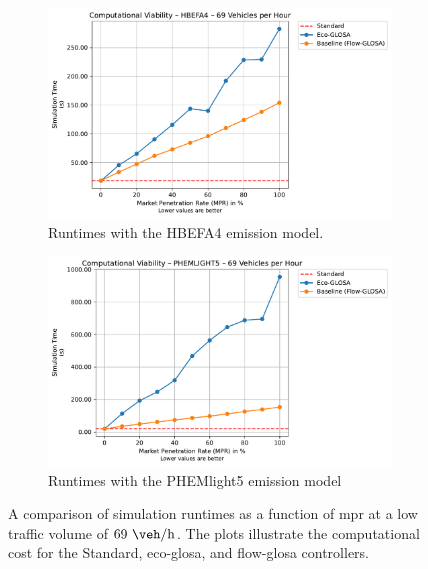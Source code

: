 \begin{figure}[htb]
  \centering
  \begin{subfigure}[b]{0.45\textwidth}
    \includegraphics[width=\textwidth]{data/img/ComputationalViability/ComputationalViability_HBEFA4_Cars69.pdf}
    \caption{Runtimes with the HBEFA4 emission model.}
    \label{fig:Comp_69_HBEFA4}
  \end{subfigure}\hfill
  \begin{subfigure}[b]{0.45\textwidth}
    \includegraphics[width=\textwidth]{data/img/ComputationalViability/ComputationalViability_PHEMLIGHT5_Cars69.pdf}
    \caption{Runtimes with the PHEMlight5 emission model}
    \label{fig:Comp_69_PHEM}
  \end{subfigure}
  \caption[Computational Cost at Low Traffic Volume]{A comparison of simulation runtimes as a function of \ac{mpr} at a low traffic volume of $69~\unit{\veh\per\hour}$. The plots illustrate the computational cost for the Standard, \ac{eco-glosa}, and \ac{flow-glosa} controllers.}
  \label{fig:Comp_69}
\end{figure}

